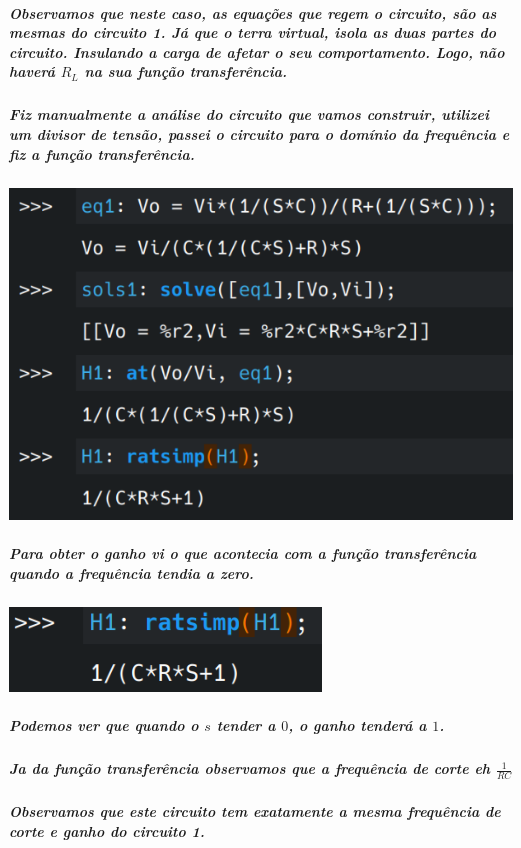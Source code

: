 \documentclass[12pt,twoside, a4paper, twocolumn]{article}
\begin{document}
\subparagraph*{Observamos que neste caso, as equações que regem o circuito, são as mesmas do circuito 1. Já que o terra virtual, isola as duas partes do circuito. Insulando a carga de afetar o seu comportamento. Logo, não haverá $R_L$ na sua função transferência.}


\subparagraph*{Fiz manualmente a análise do circuito que vamos construir, utilizei um divisor de tensão, passei o circuito para o domínio da frequência e fiz a função transferência.}
\subparagraph*{}


\begin{adjustbox}{scale=0.4}
    \includegraphics{eqs1.png}
\end{adjustbox}




\subparagraph*{Para obter o ganho vi o que acontecia com a função transferência quando a frequência tendia a zero.}
\subparagraph*{}
\begin{adjustbox}{scale=0.4}
    \includegraphics{ganho1.png}
\end{adjustbox}
\subparagraph*{Podemos ver que quando o $s$ tender a $0$, o ganho tenderá a $1$.}


\subparagraph*{Ja da função transferência observamos que a frequência de corte eh $\frac{1}{RC}$}




\subparagraph*{Observamos que este circuito  tem exatamente a mesma frequência de corte e ganho do circuito 1.}
\end{document}
